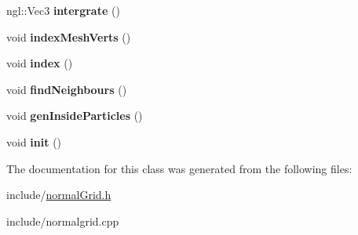 \begin{DoxyCompactItemize}
\item 
\hypertarget{classnormalGrid_a820e9674949c47ff5ef6a3da6867546d}{ngl\-::\-Vec3 {\bfseries intergrate} ()}\label{classnormalGrid_a820e9674949c47ff5ef6a3da6867546d}

\item 
\hypertarget{classnormalGrid_a6135fe9dbc512ec9d043f1f9cb53ea49}{void {\bfseries index\-Mesh\-Verts} ()}\label{classnormalGrid_a6135fe9dbc512ec9d043f1f9cb53ea49}

\item 
\hypertarget{classnormalGrid_a7057df16ab3ef810f4cb9dcc3d957ffd}{void {\bfseries index} ()}\label{classnormalGrid_a7057df16ab3ef810f4cb9dcc3d957ffd}

\item 
\hypertarget{classnormalGrid_a2f8e898955fb3e5ab95131140eddf325}{void {\bfseries find\-Neighbours} ()}\label{classnormalGrid_a2f8e898955fb3e5ab95131140eddf325}

\item 
\hypertarget{classnormalGrid_ad6e4d633d18b28323f0f96d2a3b58934}{void {\bfseries gen\-Inside\-Particles} ()}\label{classnormalGrid_ad6e4d633d18b28323f0f96d2a3b58934}

\item 
\hypertarget{classnormalGrid_ada9b1c3fc803e488ffceaa7c58c96579}{void {\bfseries init} ()}\label{classnormalGrid_ada9b1c3fc803e488ffceaa7c58c96579}

\end{DoxyCompactItemize}


The documentation for this class was generated from the following files\-:\begin{DoxyCompactItemize}
\item 
include/\hyperlink{normalGrid_8h}{normal\-Grid.\-h}\item 
include/normalgrid.\-cpp\end{DoxyCompactItemize}

